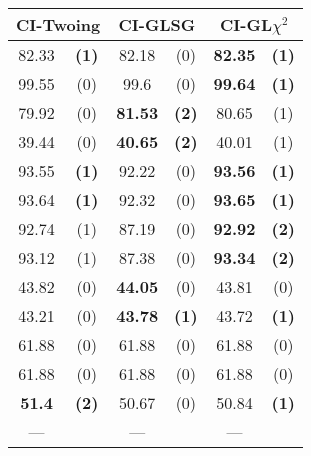 \begin{table*}
\begin{subtable}{.4\linewidth}
\begin{tabular}{cc|cc|cc} 
\multicolumn{2}{c|}{CI-Twoing} &   \multicolumn{2}{c|}{CI-GLSG} & \multicolumn{2}{c}{CI-GL$\chi^2$} \\  \hline   
 82.33      &  {\bf (1)}       &   82.18      & (0)             & {\bf 82.35} &  {\bf (1)}          \\
 99.55      &  (0)             &   99.6       & (0)             & {\bf 99.64} &  {\bf (1)}          \\
 79.92      &  (0)             &  {\bf 81.53} & {\bf (2)}       &  80.65      &  (1)                \\
 39.44      &  (0)             &  {\bf 40.65} & {\bf (2)}       &  40.01      &  (1)                \\
 93.55      &  {\bf (1)}       &   92.22      & (0)             & {\bf 93.56} &  {\bf (1)}          \\
 93.64      &  {\bf (1)}       &   92.32      & (0)             & {\bf 93.65} &  {\bf (1)}          \\
 92.74      &  (1)             &   87.19      & (0)             & {\bf 92.92} &  {\bf (2)}          \\
 93.12      &  (1)             &   87.38      & (0)             & {\bf 93.34} &  {\bf (2)}          \\
 43.82      &  (0)             &   {\bf 44.05}& (0)             &  43.81      &  (0)                \\
 43.21      &  (0)             &   {\bf 43.78}& {\bf (1)}       &  43.72      &  {\bf (1)}          \\
 61.88      &  (0)             &   61.88      & (0)             &  61.88      &  (0)                \\
 61.88      &  (0)             &   61.88      & (0)             &  61.88      &  (0)                \\
 {\bf 51.4} &  {\bf (2)}       &   50.67      & (0)             &  50.84      &  {\bf (1)}          \\
 ---        &                  &   ---        &                 &   ---       &                     \\

\end{tabular}
\end{subtable}
\end{table*}
